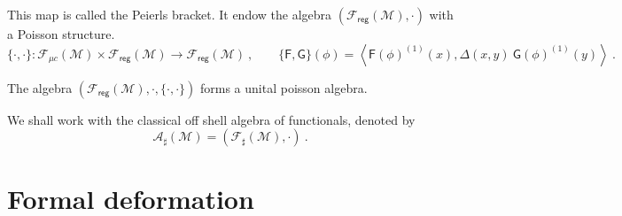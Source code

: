 \documentclass[10pt]{book}
\newcommand{\reg}{\mathsf{reg}}
\newcommand{\sm}[1]{\left\langle#1\right\rangle}
\newcommand{\Acal}{\mathcal{A}}
\newcommand{\Fcal}{\mathcal{F}}
\newcommand{\Mcal}{\mathcal{M}}
\newcommand{\Fsf}{\mathsf{F}}
\newcommand{\Gsf}{\mathsf{G}}
\theoremstyle{break}
\begin{document}
\bigskip


This map is called the Peierls bracket. It endow the algebra $(\Fcal_\reg(\Mcal),\cdot)$ with a Poisson structure. 
%
\begin{equation}
\{\cdot,\cdot\} : \Fcal_{\mu c}(\Mcal) \times \Fcal_{\reg}(\Mcal) \to \Fcal_\reg(\Mcal) \ ,
\qquad
\{\Fsf,\Gsf\}(\phi) = \sm{\Fsf(\phi)^{(1)}(x) , \Delta(x,y) \ \Gsf(\phi)^{(1)}(y)} \ .
\end{equation}
%

The algebra $\left(\Fcal_\reg(\Mcal), \cdot , \{\cdot,\cdot\}\right)$ forms a unital poisson algebra.


\bigskip


We shall work with the classical off shell algebra of functionals, denoted by
%
\begin{equation*}
\Acal_\sharp(\Mcal) = \left(\Fcal_\sharp(\Mcal), \cdot\right) \ . 
\end{equation*}


\section{Formal deformation}
\end{document}
